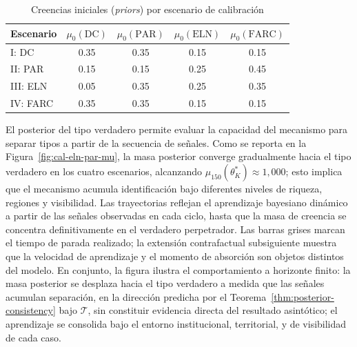 \documentclass[pdflatex,sn-mathphys-ay]{sn-jnl}
\theoremstyle{thmstyleone}
\theoremstyle{thmstyletwo}
\theoremstyle{thmstylethree}
\newcommand{\1}{\mathbf{1}}
\begin{document}
\begin{table}[!ht]
\small
\caption{Creencias iniciales (\emph{priors}) por escenario de calibración}
\label{tab:priors-escenarios}
\begin{tabular}{lcccc}
\toprule
Escenario & $\mu_0(\mathrm{DC})$ & $\mu_0(\mathrm{PAR})$ & $\mu_0(\mathrm{ELN})$ & $\mu_0(\mathrm{FARC})$ \\ \midrule
I: DC & 0.35 & 0.35 & 0.15 & 0.15 \\
II: PAR & 0.15 & 0.15 & 0.25 & 0.45 \\
III: ELN & 0.05 & 0.35 & 0.25 & 0.35 \\
IV: FARC & 0.35 & 0.35 & 0.15 & 0.15 \\ \bottomrule
\end{tabular}
\end{table}

El posterior del tipo verdadero permite evaluar la capacidad del mecanismo para separar tipos a partir de la secuencia de señales. Como se reporta en la Figura~\ref{fig:cal-eln-par-mu}, la masa posterior converge gradualmente hacia el tipo verdadero en los cuatro escenarios, alcanzando $\mu_{150}(\theta_K^\ast)\approx 1{,}000$; esto implica que el mecanismo acumula identificación bajo diferentes niveles de riqueza, regiones y visibilidad. Las trayectorias reflejan el aprendizaje bayesiano dinámico a partir de las señales observadas en cada ciclo, hasta que la masa de creencia se concentra definitivamente en el verdadero perpetrador. Las barras grises marcan el tiempo de parada realizado; la extensión contrafactual subsiguiente muestra que la velocidad de aprendizaje y el momento de absorción son objetos distintos del modelo. En conjunto, la figura ilustra el comportamiento a horizonte finito: la masa posterior se desplaza hacia el tipo verdadero a medida que las señales acumulan separación, en la dirección predicha por el Teorema~\ref{thm:posterior-consistency} bajo $\mathcal{T}$, sin constituir evidencia directa del resultado asintótico; el aprendizaje se consolida bajo el entorno institucional, territorial, y de visibilidad de cada caso.
\end{document}
